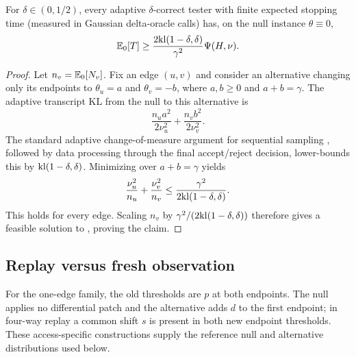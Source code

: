 \begin{theorem}
\label{thm:lower}
For $\delta\in(0,1/2)$, every adaptive $\delta$-correct tester with finite
expected stopping time (measured in Gaussian delta-oracle calls) has, on the null instance $\theta\equiv0$,
\begin{equation}\label{eq:formal-results-004}
\mathbb{E}_0[T]
\ge
\frac{2\mathrm{kl}(1-\delta,\delta)}{\gamma^2}\Psi(H,\nu).
\end{equation}
\end{theorem}

\begin{proof}
Let $n_v=\mathbb{E}_0[N_v]$.  Fix an edge $(u,v)$ and consider an alternative changing
only its endpoints to $\theta_u=a$ and $\theta_v=-b$, where $a,b\ge0$ and
$a+b=\gamma$.  The adaptive transcript KL from the null to this alternative is
\begin{equation}\label{eq:formal-results-005}
\frac{n_u a^2}{2\nu_u^2}+\frac{n_v b^2}{2\nu_v^2}.
\end{equation}
The standard adaptive change-of-measure argument for sequential sampling
\cite{Chernoff1959,CohenZhao2015}, followed by data processing through the final
accept/reject decision, lower-bounds this by $\mathrm{kl}(1-\delta,\delta)$.  Minimizing over $a+b=\gamma$ yields
\begin{equation}\label{eq:formal-results-006}
\frac{\nu_u^2}{n_u}+\frac{\nu_v^2}{n_v}
\le
\frac{\gamma^2}{2\mathrm{kl}(1-\delta,\delta)}.
\end{equation}
This holds for every edge.  Scaling $n_v$ by
$\gamma^2/(2\mathrm{kl}(1-\delta,\delta))$ therefore gives a feasible solution to
, proving the claim.
\end{proof}


\subsection{Replay versus fresh observation}


For the one-edge family, the old thresholds are $p$ at both endpoints. The null applies no differential patch and the alternative adds $d$ to the first endpoint; in four-way replay a common shift $s$ is present in both new endpoint thresholds. These access-specific constructions supply the reference null and alternative distributions used below.


